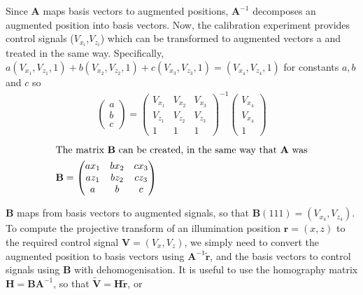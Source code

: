 Since $\textbf{A}$ maps basis vectors to augmented positions, $\textbf{A}^{-1}$ decomposes an augmented position into basis vectors.
Now, the calibration experiment provides control signals ($V_{x_i}$,$V_{z_i}$) which can be transformed to augmented vectors a and treated in the same way. Specifically, ${a(V_{x_1},V_{z_1},1) + b(V_{x_2},V_{z_2},1)+c(V_{x_3},V_{z_3},1) = (V_{x_4},V_{z_4},1)}$ for constants $a,b$ and $c$ so
\begin{align}
  \begin{pmatrix}
  a  \\
  b \\
  c
  \end{pmatrix}
  =
  \begin{pmatrix}
  V_{x_1}& V_{x_2} & V_{x_3} \\
  V_{z_1} & V_{z_2} & V_{z_3} \\
  1 & 1 & 1
  \end{pmatrix}^{-1}
  \begin{pmatrix}
  V_{x_4}  \\
  V_{x_4} \\
  1
  \end{pmatrix}
\end{align}
\begin{align}
  \intertext{The matrix $\textbf{B}$ can be created, in the same way that \textbf{A} was}
\textbf{B} =
\begin{pmatrix}
a x_1 & b x_2 & c x_3 \\
a z_1 & b z_2 & c z_3 \\
a & b & c
\end{pmatrix}
\end{align}

\textbf{B} maps from basis vectors to augmented signals, so that $\textbf{B}(111)=\left( V_{x_4},V_{z_4} \right)$.
To compute the projective transform of an illumination position $\textbf{r}=(x,z)$ to the required control signal $\textbf{V} = (V_x,V_z)$, we simply need to convert the augmented position to basis vectors using ${\textbf{A}}^{-1}\widetilde{\textbf{r}}$, and the basis vectors to control signals using $\textbf{B}$ with dehomogenisation.
It is useful to use the homography matrix $\textbf{H} = \textbf{B}\textbf{A}^{-1}$, so that $\widetilde{\textbf{V}} = \textbf{H} \widetilde{\textbf{r}}$, or

